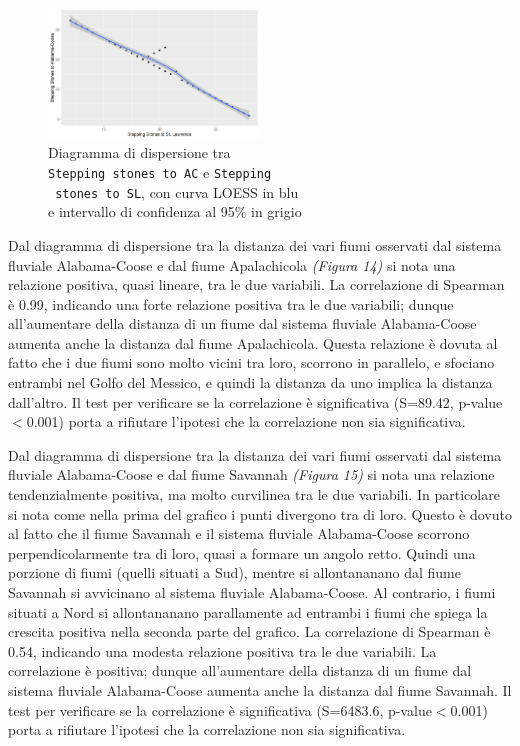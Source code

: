 \documentclass{article} %
\begin{document}
\begin{figure}[H]
        \centering
        \includegraphics[width=0.5\textwidth]{immagini/ac_sl.png}
        \captionsetup{justification=centering}
        \caption{Diagramma di dispersione tra \\\texttt{Stepping stones to AC} e \texttt{Stepping}\\\texttt{ stones to SL}, con curva LOESS in blu \\e intervallo di confidenza al 95\% in grigio}
\end{figure}
Dal diagramma di dispersione tra la distanza dei vari fiumi osservati dal sistema fluviale Alabama-Coose e dal fiume Apalachicola \textit{(Figura 14)} si nota una relazione positiva, quasi lineare, tra le due variabili.  
La correlazione di Spearman è 0.99, indicando una forte relazione positiva tra le due variabili; dunque all'aumentare della distanza di un fiume dal sistema fluviale Alabama-Coose aumenta anche la distanza dal fiume Apalachicola. 
Questa relazione è dovuta al fatto che i due fiumi sono molto vicini tra loro, scorrono in parallelo, e sfociano entrambi nel Golfo del Messico, e quindi la distanza da uno implica la distanza dall'altro.
Il test per verificare se la correlazione è significativa (S=89.42, p-value$<$0.001) porta a rifiutare l'ipotesi che la correlazione non sia significativa.


Dal diagramma di dispersione tra la distanza dei vari fiumi osservati dal sistema fluviale Alabama-Coose e dal fiume Savannah \textit{(Figura 15)} si nota una relazione tendenzialmente positiva, ma molto curvilinea tra le due variabili. 
In particolare si nota come nella prima del grafico i punti divergono tra di loro. Questo è dovuto al fatto che il fiume Savannah e il sistema fluviale Alabama-Coose scorrono perpendicolarmente tra di loro, quasi a formare un angolo retto. Quindi una porzione di fiumi (quelli situati a Sud), mentre si allontananano dal fiume Savannah si avvicinano al sistema fluviale Alabama-Coose. Al contrario, i fiumi situati a Nord si allontananano parallamente ad entrambi i fiumi che spiega la crescita positiva nella seconda parte del grafico.
La correlazione di Spearman è 0.54, indicando una modesta relazione positiva tra le due variabili. La correlazione è positiva; dunque all'aumentare della distanza di un fiume dal sistema fluviale Alabama-Coose aumenta anche la distanza dal fiume Savannah. 
Il test per verificare se la correlazione è significativa (S=6483.6, p-value$<$0.001) porta a rifiutare l'ipotesi che la correlazione non sia significativa.
\end{document}
